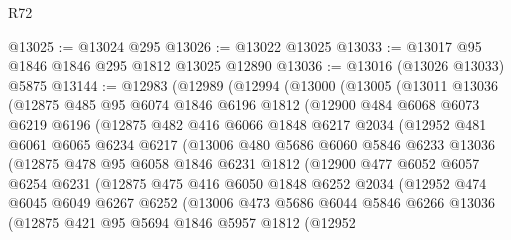 \begin{lexlean}{R72}
\begin{coremodule}
@13025 := @13024 @295
@13026 := @13022 @13025
@13033 := @13017 @95 @1846 @1846 @295 @1812 @13025 @12890
@13036 := @13016 (@13026 @13033) @5875
@13144 := @12983
    (@12989
      (@12994
        (@13000
          (@13005
            (@13011
              @13036
              (@12875
                @485
                @95
                @6074
                @1846
                @6196
                @1812
                (@12900
                  @484
                  @6068
                  @6073
                  @6219
                  @6196
                  (@12875
                    @482
                    @416
                    @6066
                    @1848
                    @6217
                    @2034
                    (@12952
                      @481
                      @6061
                      @6065
                      @6234
                      @6217
                      (@13006
                        @480
                        @5686
                        @6060
                        @5846
                        @6233
                        @13036
                        (@12875
                          @478
                          @95
                          @6058
                          @1846
                          @6231
                          @1812
                          (@12900
                            @477
                            @6052
                            @6057
                            @6254
                            @6231
                            (@12875
                              @475
                              @416
                              @6050
                              @1848
                              @6252
                              @2034
                              (@12952
                                @474
                                @6045
                                @6049
                                @6267
                                @6252
                                (@13006
                                  @473
                                  @5686
                                  @6044
                                  @5846
                                  @6266
                                  @13036
                                  (@12875
                                    @421
                                    @95
                                    @5694
                                    @1846
                                    @5957
                                    @1812
                                    (@12952

\end{coremodule}
\end{lexlean}
